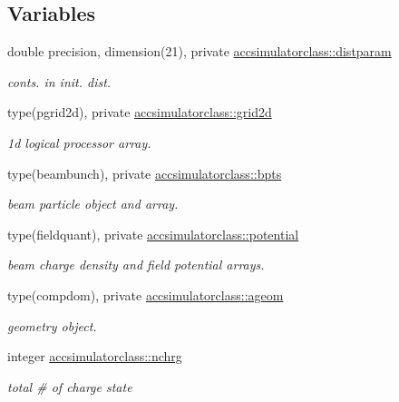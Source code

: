 \subsection*{Variables}
\begin{DoxyCompactItemize}
\item 
double precision, dimension(21), private \mbox{\hyperlink{namespaceaccsimulatorclass_a1b6defb6bd9b1c4ddada0b30c99f4dd5}{accsimulatorclass\+::distparam}}
\begin{DoxyCompactList}\small\item\em conts. in init. dist. \end{DoxyCompactList}\item 
type(pgrid2d), private \mbox{\hyperlink{namespaceaccsimulatorclass_a7fbad7f6e18df1ec95d1f76620a8bd80}{accsimulatorclass\+::grid2d}}
\begin{DoxyCompactList}\small\item\em 1d logical processor array. \end{DoxyCompactList}\item 
type(beambunch), private \mbox{\hyperlink{namespaceaccsimulatorclass_a4d06760340147c29a3ce5ba4f4ba9066}{accsimulatorclass\+::bpts}}
\begin{DoxyCompactList}\small\item\em beam particle object and array. \end{DoxyCompactList}\item 
type(fieldquant), private \mbox{\hyperlink{namespaceaccsimulatorclass_a2d7cf949e4c05edf370cfbb6ee936951}{accsimulatorclass\+::potential}}
\begin{DoxyCompactList}\small\item\em beam charge density and field potential arrays. \end{DoxyCompactList}\item 
type(compdom), private \mbox{\hyperlink{namespaceaccsimulatorclass_ac6dafc4c6322db3e6507ece8c3ff9e37}{accsimulatorclass\+::ageom}}
\begin{DoxyCompactList}\small\item\em geometry object. \end{DoxyCompactList}\item 
integer \mbox{\hyperlink{namespaceaccsimulatorclass_ac4f089e8c954990197b1d251b800692f}{accsimulatorclass\+::nchrg}}
\begin{DoxyCompactList}\small\item\em total \# of charge state \end{DoxyCompactList}\item 

\end{DoxyCompactItemize}
